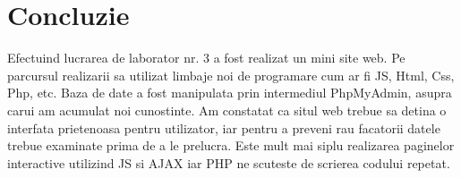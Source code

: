 \section*{Concluzie}
Efectuind lucrarea de laborator nr. 3 a fost realizat un mini site web. Pe parcursul realizarii sa utilizat limbaje noi de programare cum ar fi JS, Html, Css, Php, etc. 
Baza de date a fost manipulata prin intermediul PhpMyAdmin, asupra carui am acumulat noi cunostinte. Am constatat ca situl web trebue sa detina o interfata prietenoasa pentru utilizator, iar pentru a preveni rau facatorii datele trebue examinate prima de a le prelucra. Este mult mai siplu realizarea paginelor interactive utilizind JS si AJAX iar PHP ne scuteste de scrierea codului repetat.
\clearpage